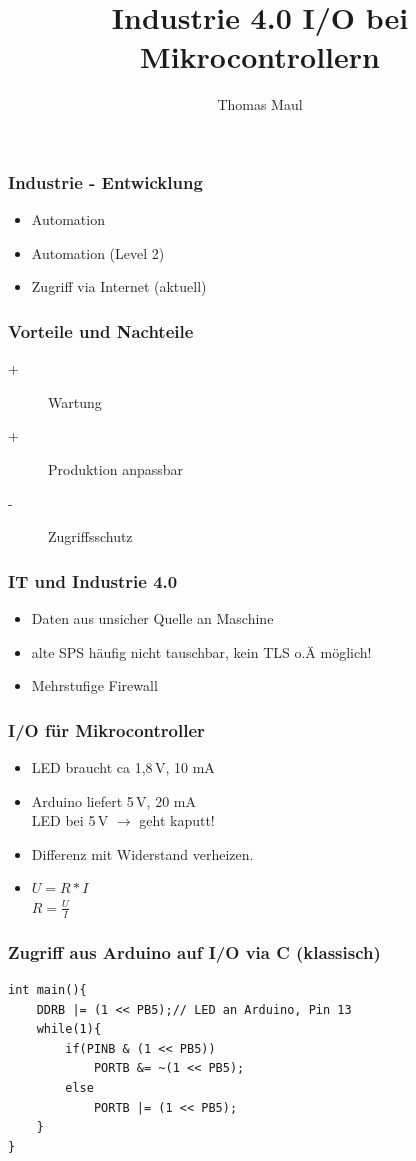 \documentclass[aspectratio=169]{beamer}
\title{Industrie 4.0 I/O bei Mikrocontrollern}
\author{Thomas Maul}
\institute[BWS Hofheim]{Brühlwiesenschule, Hofheim}
\begin{document}
\begin{frame}
  \titlepage
\end{frame}
\begin{frame}
  \frametitle{Industrie - Entwicklung}
  \begin{itemize}
      \item Automation
      \item Automation (Level 2)
      \item Zugriff via Internet (aktuell)
  \end{itemize}
\end{frame}

\begin{frame}
  \frametitle{Vorteile und Nachteile}
    \begin{description} 
        \item[+] Wartung
        \item[+] Produktion anpassbar 
        \item[-] Zugriffsschutz 
    \end{description}
\end{frame}

\begin{frame}
  \frametitle{IT und Industrie 4.0}
  \begin{itemize}
    \item Daten aus unsicher Quelle an Maschine
    \item alte SPS häufig nicht tauschbar, kein TLS o.Ä möglich!
    \item Mehrstufige Firewall
  \end{itemize}
\end{frame}

\begin{frame}
  \frametitle{I/O für Mikrocontroller}
  \begin{itemize}
      \item LED braucht ca 1,8\,V, 10 mA
      \item Arduino liefert 5\,V, 20 mA\\ LED bei 5\,V $\rightarrow$ geht kaputt!
      \item Differenz mit Widerstand verheizen.
      \item $U = R * I$\\ $R = \frac{U}{I}$
  \end{itemize}
\end{frame}

\begin{frame}[fragile]
    \frametitle{Zugriff aus Arduino auf I/O via C (klassisch)}
    \begin{lstlisting}
int main(){
    DDRB |= (1 << PB5);// LED an Arduino, Pin 13
    while(1){
        if(PINB & (1 << PB5))
            PORTB &= ~(1 << PB5);
        else
            PORTB |= (1 << PB5);
    }
}    
    \end{lstlisting}
\end{frame}
\end{document}
